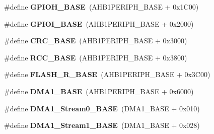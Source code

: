 \begin{DoxyCompactItemize}
\item 
\#define {\bfseries G\+P\+I\+O\+H\+\_\+\+B\+A\+SE}~(A\+H\+B1\+P\+E\+R\+I\+P\+H\+\_\+\+B\+A\+SE + 0x1\+C00)\hypertarget{group___peripheral__memory__map_gaee4716389f3a1c727495375b76645608}{}\label{group___peripheral__memory__map_gaee4716389f3a1c727495375b76645608}

\item 
\#define {\bfseries G\+P\+I\+O\+I\+\_\+\+B\+A\+SE}~(A\+H\+B1\+P\+E\+R\+I\+P\+H\+\_\+\+B\+A\+SE + 0x2000)\hypertarget{group___peripheral__memory__map_ga50acf918c2e1c4597d5ccfe25eb3ad3d}{}\label{group___peripheral__memory__map_ga50acf918c2e1c4597d5ccfe25eb3ad3d}

\item 
\#define {\bfseries C\+R\+C\+\_\+\+B\+A\+SE}~(A\+H\+B1\+P\+E\+R\+I\+P\+H\+\_\+\+B\+A\+SE + 0x3000)\hypertarget{group___peripheral__memory__map_ga656a447589e785594cbf2f45c835ad7e}{}\label{group___peripheral__memory__map_ga656a447589e785594cbf2f45c835ad7e}

\item 
\#define {\bfseries R\+C\+C\+\_\+\+B\+A\+SE}~(A\+H\+B1\+P\+E\+R\+I\+P\+H\+\_\+\+B\+A\+SE + 0x3800)\hypertarget{group___peripheral__memory__map_ga0e681b03f364532055d88f63fec0d99d}{}\label{group___peripheral__memory__map_ga0e681b03f364532055d88f63fec0d99d}

\item 
\#define {\bfseries F\+L\+A\+S\+H\+\_\+\+R\+\_\+\+B\+A\+SE}~(A\+H\+B1\+P\+E\+R\+I\+P\+H\+\_\+\+B\+A\+SE + 0x3\+C00)\hypertarget{group___peripheral__memory__map_ga8e21f4845015730c5731763169ec0e9b}{}\label{group___peripheral__memory__map_ga8e21f4845015730c5731763169ec0e9b}

\item 
\#define {\bfseries D\+M\+A1\+\_\+\+B\+A\+SE}~(A\+H\+B1\+P\+E\+R\+I\+P\+H\+\_\+\+B\+A\+SE + 0x6000)\hypertarget{group___peripheral__memory__map_gab2d8a917a0e4ea99a22ac6ebf279bc72}{}\label{group___peripheral__memory__map_gab2d8a917a0e4ea99a22ac6ebf279bc72}

\item 
\#define {\bfseries D\+M\+A1\+\_\+\+Stream0\+\_\+\+B\+A\+SE}~(D\+M\+A1\+\_\+\+B\+A\+SE + 0x010)\hypertarget{group___peripheral__memory__map_ga0d3c52aa35dcc68f78b704dfde57ba95}{}\label{group___peripheral__memory__map_ga0d3c52aa35dcc68f78b704dfde57ba95}

\item 
\#define {\bfseries D\+M\+A1\+\_\+\+Stream1\+\_\+\+B\+A\+SE}~(D\+M\+A1\+\_\+\+B\+A\+SE + 0x028)\hypertarget{group___peripheral__memory__map_ga5b4152cef577e37eccc9311d8bdbf3c2}{}\label{group___peripheral__memory__map_ga5b4152cef577e37eccc9311d8bdbf3c2}


\end{DoxyCompactItemize}
